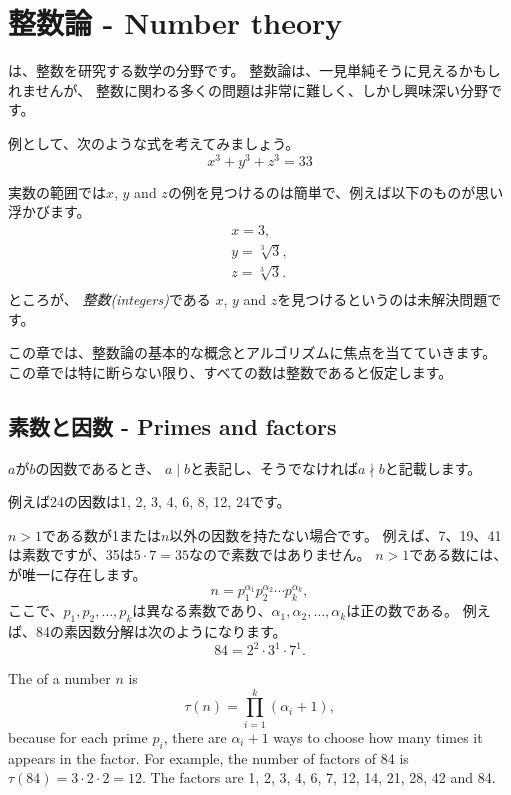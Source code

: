 \chapter{整数論 - Number theory}


は、整数を研究する数学の分野です。
整数論は、一見単純そうに見えるかもしれませんが、
整数に関わる多くの問題は非常に難しく、しかし興味深い分野です。

例として、次のような式を考えてみましょう。
\[x^3 + y^3 + z^3 = 33\]

実数の範囲では$x$, $y$ and $z$の例を見つけるのは簡単で、例えば以下のものが思い浮かびます。
\[
\begin{array}{lcl}
x = 3, \\
y = \sqrt[3]{3}, \\
z = \sqrt[3]{3}.\\
\end{array}
\]
ところが、
\emph{整数(integers)}である $x$, $y$ and $z$を見つけるというのは未解決問題です。\cite{bec07}

この章では、整数論の基本的な概念とアルゴリズムに焦点を当てていきます。
この章では特に断らない限り、すべての数は整数であると仮定します。

\section{素数と因数 - Primes and factors}



$a$が$b$の因数であるとき、 $a \mid b$と表記し、そうでなければ$a \nmid b$と記載します。

例えば24の因数は1, 2, 3, 4, 6, 8, 12, 24です。


$n>1$である数が1または$n$以外の因数を持たない場合です。
例えば、7、19、41は素数ですが、35は$5 \cdot 7 = 35$なので素数ではありません。
$n>1$である数には、が唯一に存在します。
\[ n = p_1^{\alpha_1} p_2^{\alpha_2} \cdots p_k^{\alpha_k},\]
ここで、$p_1,p_2,\ldots,p_k$は異なる素数であり、$\alpha_1,\alpha_2,\ldots,\alpha_k$は正の数である。
例えば、84の素因数分解は次のようになります。
\[84 = 2^2 \cdot 3^1 \cdot 7^1.\]

The  of a number $n$ is
\[\tau(n)=\prod_{i=1}^k (\alpha_i+1),\]
because for each prime $p_i$, there are
$\alpha_i+1$ ways to choose how many times
it appears in the factor.
For example, the number of factors
of 84 is
$\tau(84)=3 \cdot 2 \cdot 2 = 12$.
The factors are
1, 2, 3, 4, 6, 7, 12, 14, 21, 28, 42 and 84.

